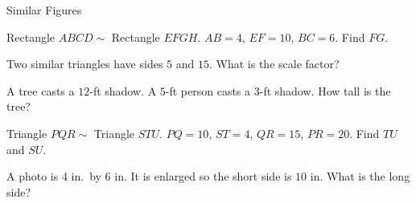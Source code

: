 \begin{practiceBox}{Similar Figures}
\resetProblems

\prob Rectangle $ABCD \sim$ Rectangle $EFGH$. $AB = 4$, $EF = 10$, $BC = 6$. Find $FG$.

\prob Two similar triangles have sides $5$ and $15$. What is the scale factor?

\prob A tree casts a $12$-ft shadow. A $5$-ft person casts a $3$-ft shadow. How tall is the tree?

\prob Triangle $PQR \sim$ Triangle $STU$. $PQ = 10$, $ST = 4$, $QR = 15$, $PR = 20$. Find $TU$ and $SU$.

\prob A photo is $4$ in.\ by $6$ in. It is enlarged so the short side is $10$ in. What is the long side?

\end{practiceBox}
